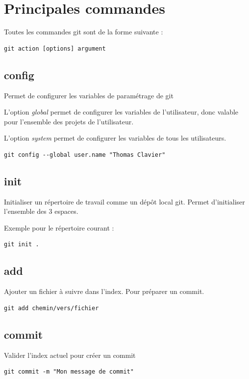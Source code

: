 \documentclass[a4paper]{article}
\begin{document}
\section*{Principales commandes}

Toutes les commandes git sont de la forme suivante : 
\begin{verbatim}
git action [options] argument
\end{verbatim}

\subsection*{config}

Permet de configurer les variables de paramétrage de git

L'option \textit{global} permet de configurer les variables de l'utilisateur, donc valable pour l'ensemble des projets de l'utilisateur.

L'option \textit{system} permet de configurer les variables de tous les utilisateurs.

\begin{verbatim}
git config --global user.name "Thomas Clavier"
\end{verbatim}

\subsection*{init}

Initialiser un répertoire de travail comme un dépôt local git. Permet d'initialiser l'ensemble des 3 espaces.

Exemple pour le répertoire courant : 
\begin{verbatim}
git init .
\end{verbatim}

\subsection*{add}
Ajouter un fichier à suivre dans l'index. Pour préparer un commit.
\begin{verbatim}
git add chemin/vers/fichier
\end{verbatim}

\subsection*{commit}
Valider l'index actuel pour créer un commit
\begin{verbatim}
git commit -m "Mon message de commit"
\end{verbatim}
\end{document}
